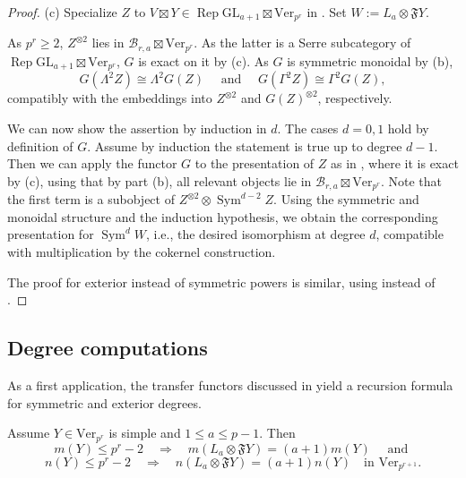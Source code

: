 \documentclass[11pt,oneside]{amsart}
\theoremstyle{definition}
\theoremstyle{remark}
\numberwithin{equation}{section}
\newcommand\cB{\mathcal B}
\newcommand\Ver{\mathrm{Ver}}
\newcommand\GL{\mathrm{GL}}
\newcommand\Rep{\operatorname{Rep}}
\newcommand\Sym{\operatorname{Sym}}
\renewcommand\o\otimes
\renewcommand\:\colon
\newcommand\Ffrak{\mathfrak F}
\begin{document}
\begin{proof}
(c) Specialize $Z$ to $V\boxtimes Y\in \Rep\GL_{a+1}\boxtimes\Ver_{p^r}$ in . Set $W:=L_a\o \Ffrak Y$.

As $p^r\ge 2$, $Z^{\o 2}$ lies in $\cB_{r,a}\boxtimes\Ver_{p^r}$. As the latter is a Serre subcategory of $\Rep\GL_{a+1}\boxtimes\Ver_{p^r}$, $G$ is exact on it by (c). As $G$ is symmetric monoidal by (b),
$$
G(\Lambda^2 Z)\cong \Lambda^2 G(Z) 
\quad\text{ and }\quad
G(\Gamma^2 Z)\cong \Gamma^2 G(Z) ,
$$
compatibly with the embeddings into $Z^{\o 2}$ and $G(Z)^{\o 2}$, respectively.

We can now show the assertion by induction in $d$.
The cases $d=0,1$ hold by definition of $G$. Assume by induction the statement is true up to degree $d-1$. Then we can apply the functor $G$ to the presentation of $Z$ as in , where it is exact by (c), using that by part (b), all relevant objects lie in $\cB_{r,a}\boxtimes\Ver_{p^r}$. Note that the first term is a subobject of $Z^{\o2}\o\Sym^{d-2}Z$. Using the symmetric and monoidal structure and the induction hypothesis, we obtain the corresponding presentation for $\Sym^d W$, i.e., the desired isomorphism at degree $d$, compatible with multiplication by the cokernel construction.

The proof for exterior instead of symmetric powers is similar, using  instead of .
\end{proof}


\subsection{Degree computations} As a first application, the transfer functors discussed in  yield a recursion formula for symmetric and exterior degrees.

\begin{proposition} \label{prop:recursion} Assume $Y\in\Ver_{p^r}$ is simple and $1\le a\le p-1$. Then
$$
m(Y)\le p^r-2 
\quad\Rightarrow\quad
m(L_a \o \Ffrak Y) = (a+1) m(Y) 
\quad\text{ and }
$$
$$
n(Y) \le p^r-2 
\quad\Rightarrow\quad
n(L_a \o \Ffrak Y) = (a+1) n(Y)
\quad\text{in } \Ver_{p^{r+1}} .
$$
\end{proposition}
\end{document}
